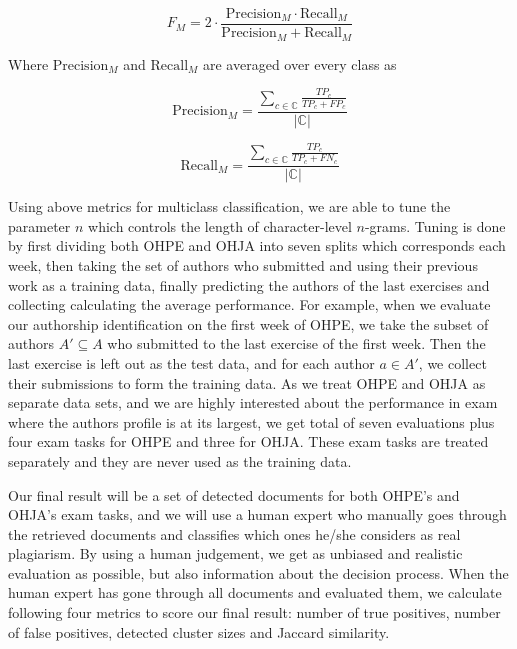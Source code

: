 \begin{equation}
    F_M = 2 \cdot \dfrac{\text{Precision}_M \cdot \text{Recall}_M}{\text{Precision}_M + \text{Recall}_M}
\end{equation}

\noindent
Where $\text{Precision}_M$ and $\text{Recall}_M$ are averaged over every class as

\begin{equation}
    \text{Precision}_M = \dfrac{\sum \limits_{c \in \mathbb{C}}
        \frac{TP_c}
             {TP_c + FP_c}}
    {|\mathbb{C}|}
\end{equation}

\begin{equation}
    \text{Recall}_M = \dfrac{\sum \limits_{c \in \mathbb{C}}
        \frac{TP_c}
             {TP_c + FN_c}}
    {|\mathbb{C}|}
\end{equation}



\noindent
Using above metrics for multiclass classification, we are able to tune the parameter $n$ which controls the length of character-level $n$-grams. Tuning is done by first dividing both OHPE and OHJA into seven splits which corresponds each week, then taking the set of authors who submitted and using their previous work as a training data, finally predicting the authors of the last exercises and collecting calculating the average performance. For example, when we evaluate our authorship identification on the first week of OHPE, we take the subset of authors $A' \subseteq A$ who submitted to the last exercise of the first week. Then the last exercise is left out as the test data, and for each author $a \in A'$, we collect their submissions to form the training data. As we treat OHPE and OHJA as separate data sets, and we are highly interested about the performance in exam where the authors profile is at its largest, we get total of seven evaluations plus four exam tasks for OHPE and three for OHJA. These exam tasks are treated separately and they are never used as the training data. 


Our final result will be a set of detected documents for both OHPE's and OHJA's exam tasks, and we will use a human expert who manually goes through the retrieved documents and classifies which ones he/she considers as real plagiarism. By using a human judgement, we get as unbiased and realistic evaluation as possible, but also information about the decision process. When the human expert has gone through all documents and evaluated them, we calculate following four metrics to score our final result: number of true positives, number of false positives, detected cluster sizes and Jaccard similarity. 
